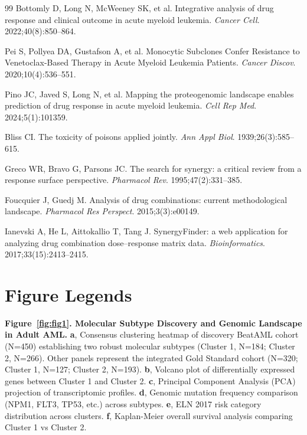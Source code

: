 \documentclass[11pt,a4paper]{article}
\begin{document}
\begin{thebibliography}{99}
Bottomly D, Long N, McWeeney SK, et al.
Integrative analysis of drug response and clinical outcome in acute myeloid leukemia.
\textit{Cancer Cell}. 2022;40(8):850--864.

Pei S, Pollyea DA, Gustafson A, et al.
Monocytic Subclones Confer Resistance to Venetoclax-Based Therapy in Acute Myeloid Leukemia Patients.
\textit{Cancer Discov}. 2020;10(4):536--551.

Pino JC, Javed S, Long N, et al.
Mapping the proteogenomic landscape enables prediction of drug response in acute myeloid leukemia.
\textit{Cell Rep Med}. 2024;5(1):101359.


Bliss CI.
The toxicity of poisons applied jointly.
\textit{Ann Appl Biol}. 1939;26(3):585--615.

Greco WR, Bravo G, Parsons JC.
The search for synergy: a critical review from a response surface perspective.
\textit{Pharmacol Rev}. 1995;47(2):331--385.

Foucquier J, Guedj M.
Analysis of drug combinations: current methodological landscape.
\textit{Pharmacol Res Perspect}. 2015;3(3):e00149.

Ianevski A, He L, Aittokallio T, Tang J.
SynergyFinder: a web application for analyzing drug combination dose--response matrix data.
\textit{Bioinformatics}. 2017;33(15):2413--2415.

\end{thebibliography}

\newpage

\newpage

\section*{Figure Legends}

\textbf{Figure~\ref{fig:fig1}. Molecular Subtype Discovery and Genomic Landscape in Adult AML.} \textbf{a}, Consensus clustering heatmap of discovery BeatAML cohort (N=450) establishing two robust molecular subtypes (Cluster 1, N=184; Cluster 2, N=266). Other panels represent the integrated Gold Standard cohort (N=320; Cluster 1, N=127; Cluster 2, N=193). \textbf{b}, Volcano plot of differentially expressed genes between Cluster 1 and Cluster 2. \textbf{c}, Principal Component Analysis (PCA) projection of transcriptomic profiles. \textbf{d}, Genomic mutation frequency comparison (NPM1, FLT3, TP53, etc.) across subtypes. \textbf{e}, ELN 2017 risk category distribution across clusters. \textbf{f}, Kaplan-Meier overall survival analysis comparing Cluster 1 vs Cluster 2.
\end{document}

